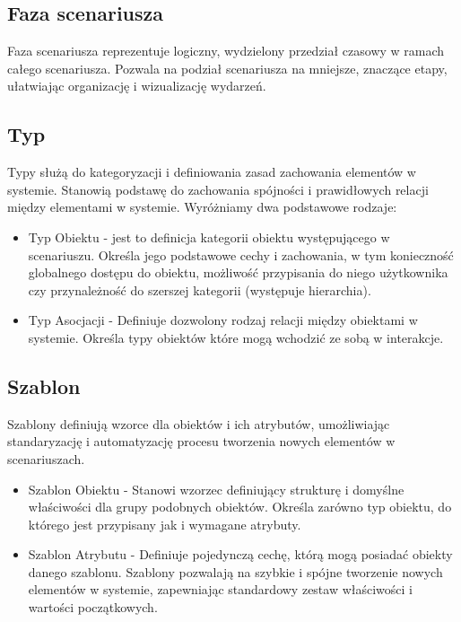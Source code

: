 \subsection{Faza scenariusza}
Faza scenariusza reprezentuje logiczny, wydzielony przedział czasowy w ramach całego scenariusza. 
Pozwala na podział scenariusza na mniejsze, znaczące etapy, ułatwiając organizację i wizualizację wydarzeń.

\subsection{Typ}

Typy służą do kategoryzacji i definiowania zasad zachowania elementów w systemie. Stanowią podstawę do zachowania spójności 
i prawidłowych relacji między elementami w systemie. Wyróżniamy dwa podstawowe rodzaje:
\begin{itemize}
    \item Typ Obiektu - jest to definicja kategorii obiektu występującego w scenariuszu. 
    Określa jego podstawowe cechy i zachowania, w tym konieczność globalnego dostępu do obiektu, 
    możliwość przypisania do niego użytkownika czy przynależność do szerszej kategorii (występuje hierarchia).
    \item Typ Asocjacji - Definiuje dozwolony rodzaj relacji między obiektami w systemie. 
    Określa typy obiektów które mogą wchodzić ze sobą w interakcje.
\end{itemize}

\subsection{Szablon}

Szablony definiują wzorce dla obiektów i ich atrybutów, umożliwiając standaryzację i automatyzację procesu tworzenia nowych 
elementów w scenariuszach.

\begin{itemize}
    \item Szablon Obiektu - Stanowi wzorzec definiujący strukturę i domyślne właściwości dla grupy podobnych obiektów. 
    Określa zarówno typ obiektu, do którego jest przypisany jak i wymagane atrybuty.
    \item Szablon Atrybutu - Definiuje pojedynczą cechę, którą mogą posiadać obiekty danego szablonu.
    Szablony pozwalają na szybkie i spójne tworzenie nowych elementów w systemie, zapewniając standardowy zestaw właściwości 
    i wartości początkowych.
\end{itemize}

